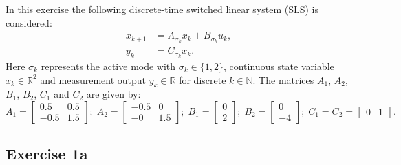 
In this exercise the following discrete-time switched linear system (SLS) is considered:
\begin{align}
    x_{k+1} &= A_{\sigma_k}x_k + B_{\sigma_k}u_k, \label{eq:ex1_systemx}\\
    y_k &= C_{\sigma_k}x_k.\label{eq:ex1_systemy}
\end{align}
Here $\sigma_k$ represents the active mode with $\sigma_k \in \{1,2\}$, continuous state variable $x_k \in \mathbb{R}^2$ and measurement output $y_k \in \mathbb{R}$ for discrete $k \in \mathbb{N}$. The matrices $A_1$, $A_2$, $B_1$, $B_2$, $C_1$ and $C_2$ are given by:
\begin{equation}
    A_1 = \begin{bmatrix} 0.5 & 0.5 \\ -0.5 & 1.5 \end{bmatrix}; \;
    A_2 = \begin{bmatrix} -0.5 & 0 \\ -0 & 1.5 \end{bmatrix}; \;
    B_1 = \begin{bmatrix} 0 \\ 2 \end{bmatrix}; \;
    B_2 = \begin{bmatrix} 0 \\ -4 \end{bmatrix}; \; 
    C_1 = C_2 = \begin{bmatrix} 0 & 1 \end{bmatrix}.
    \label{eq:ex1_matrices}
\end{equation}

\subsection{Exercise 1a}

